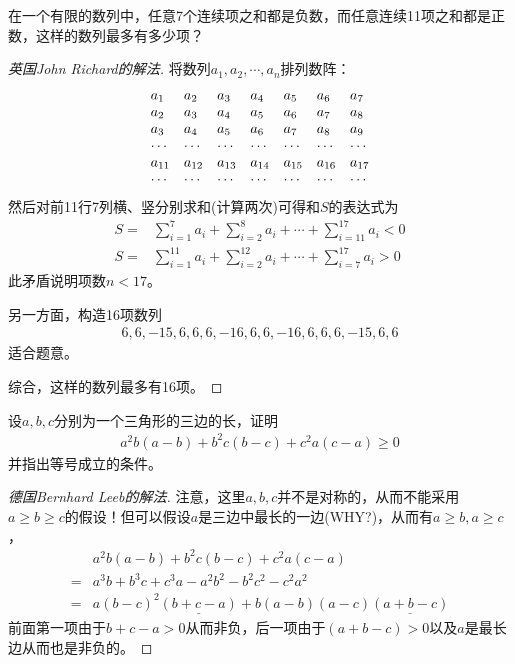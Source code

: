 \begin{example}[IMO 1977]
  在一个有限的数列中，任意7个连续项之和都是负数，而任意连续11项之和都是正数，这样的数列最多有多少项？
\end{example}
\begin{proof}[英国John Richard的解法]
  将数列$a_1,a_2,\cdots,a_n$排列数阵：
  \begin{align*}\setlength\arraycolsep{5pt}
    \begin{array}{lllllll}
      a_1 & a_2 & a_3 & a_4 & a_5 & a_6 & a_7\\
      a_2 & a_3 & a_4 & a_5 & a_6 & a_7 & a_8\\
      a_3 & a_4 & a_5 & a_6 & a_7 & a_8 & a_9\\
      \cdots & \cdots & \cdots & \cdots & \cdots & \cdots & \cdots \\
      a_{11} & a_{12} & a_{13} & a_{14} & a_{15} & a_{16} & a_{17}\\
      \cdots & \cdots & \cdots & \cdots & \cdots & \cdots & \cdots
    \end{array}
  \end{align*}
  然后对前11行7列横、竖分别求和(计算两次)可得和$S$的表达式为
  \begin{align*}
    S={}&\sum_{i=1}^7 a_i + \sum_{i=2}^8 a_i + \cdots + \sum_{i=11}^{17} a_i < 0\\
    S={}&\sum_{i=1}^{11} a_i + \sum_{i=2}^{12} a_i + \cdots + \sum_{i=7}^{17} a_i > 0
  \end{align*}
  此矛盾说明项数$n<17$。

  另一方面，构造16项数列
  \begin{align*}
    6,6,-15,6,6,6,-16,6,6,-16,6,6,6,-15,6,6
  \end{align*}
  适合题意。

  综合，这样的数列最多有16项。
\end{proof}


\begin{example}[IMO 1983]
  设$a,b,c$分别为一个三角形的三边的长，证明
  \begin{align*}
    a^2b(a-b) + b^2c(b-c) + c^2a(c-a)\ge 0
  \end{align*}
  并指出等号成立的条件。
\end{example}
\begin{proof}[德国Bernhard Leeb的解法]
  注意，这里$a,b,c$并不是对称的，从而不能采用$a\ge b\ge c$的假设！但可以假设$a$是三边中最长的一边(WHY?)，从而有$a\ge b, a\ge c$，
  \begin{align*}
       & a^2b(a-b) + b^2c(b-c) + c^2a(c-a)\\
    ={}& a^3b + b^3c + c^3a - a^2b^2 - b^2c^2 - c^2a^2\\
    ={}& a(b-c)^2\underline{(b+c-a)} + b(a-b)(a-c)\underline{(a+b-c)}
  \end{align*}
  前面第一项由于$b+c-a>0$从而非负，后一项由于$(a+b-c)>0$以及$a$是最长边从而也是非负的。
\end{proof}

